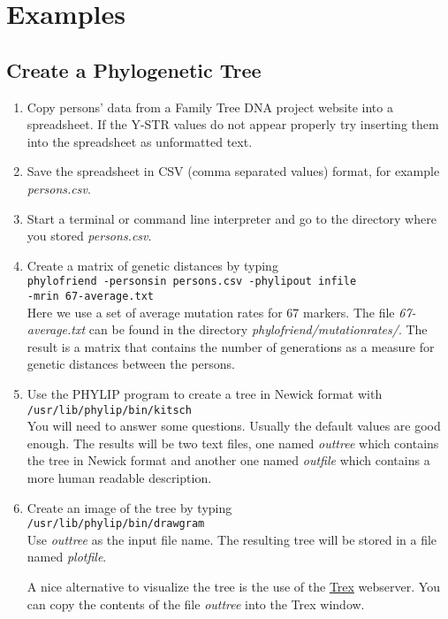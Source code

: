 \section{Examples}

\subsection{Create a Phylogenetic Tree}

\begin{enumerate}
\item Copy persons' data from a Family Tree DNA project website into
	a spreadsheet. If the Y-STR values do not appear properly try
	inserting them into the spreadsheet as unformatted text.
\item Save the spreadsheet in CSV (comma separated values)
	format, for example \emph{persons.csv}.
\item Start a terminal or command line interpreter and go
	to the directory where you stored \emph{persons.csv}.
\item Create a matrix of genetic distances by typing\\
	\texttt{phylofriend -personsin persons.csv -phylipout infile\\
	-mrin 67-average.txt}\\
	Here we use a set of average mutation rates for 67 markers.
    The file
	\emph{67-average.txt} can be found in the directory
	\emph{phylofriend/mutationrates/}.
    The result is a matrix that contains the number of generations
    as a measure for genetic distances between the persons.
\item Use the PHYLIP program to create a tree in Newick format
	with\\
	\texttt{/usr/lib/phylip/bin/kitsch}\\
	You will need to answer some questions. Usually the
	default values are good enough. The results will be
	two text files, one named \emph{outtree} which contains
	the tree in Newick format and another one named
	\emph{outfile} which contains a more human readable
	description.
\item Create an image of the tree by typing\\
	\texttt{/usr/lib/phylip/bin/drawgram}\\
	Use \emph{outtree} as the input file name.
	The resulting tree will be stored in a file named 
	\emph{plotfile}.

	A nice alternative to visualize the tree is the use of the
	\href{http://www.trex.uqam.ca/index.php?action=newick&project=trex}
	{Trex}\cite{Trex}
	webserver. You can copy the contents of the file \emph{outtree}
	into the Trex window.
\end{enumerate}


